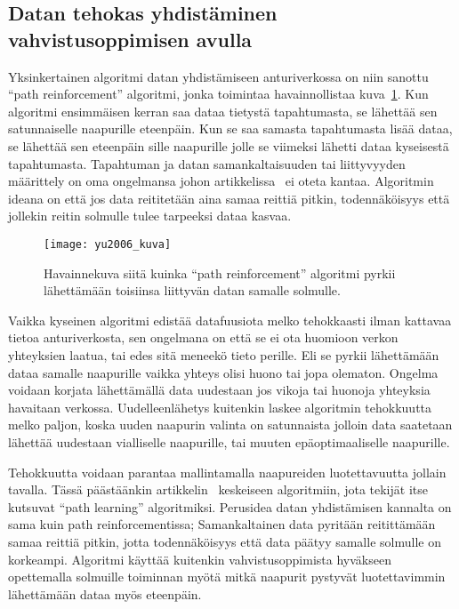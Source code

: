 \subsection{Datan tehokas yhdistäminen vahvistusoppimisen avulla}

Yksinkertainen algoritmi datan yhdistämiseen anturiverkossa on niin sanottu
``path reinforcement'' algoritmi, jonka toimintaa havainnollistaa
kuva~\ref{fig:yu2006}. Kun algoritmi ensimmäisen kerran saa dataa tietystä
tapahtumasta, se lähettää sen satunnaiselle naapurille eteenpäin. Kun se saa
samasta tapahtumasta lisää dataa, se lähettää sen eteenpäin sille naapurille
jolle se viimeksi lähetti dataa kyseisestä tapahtumasta.  Tapahtuman ja datan
samankaltaisuuden tai liittyvyyden määrittely on oma ongelmansa johon
artikkelissa~\cite{Yu2006} ei oteta kantaa. Algoritmin ideana on että jos data
reititetään aina samaa reittiä pitkin, todennäköisyys että jollekin reitin
solmulle tulee tarpeeksi dataa kasvaa.

\begin{figure}[h]
  \centering
  \texttt{[image: yu2006\_kuva]}
  \caption{Havainnekuva siitä kuinka ``path reinforcement'' algoritmi pyrkii
    lähettämään toisiinsa liittyvän datan samalle solmulle.~\parencite{Yu2006}}
\label{fig:yu2006}
\end{figure}

Vaikka kyseinen algoritmi edistää datafuusiota melko tehokkaasti ilman kattavaa
tietoa anturiverkosta, sen ongelmana on että se ei ota huomioon verkon
yhteyksien laatua, tai edes sitä meneekö tieto perille. Eli se pyrkii
lähettämään dataa samalle naapurille vaikka yhteys olisi huono tai jopa
olematon. Ongelma voidaan korjata lähettämällä data uudestaan jos vikoja tai
huonoja yhteyksia havaitaan verkossa. Uudelleenlähetys kuitenkin laskee
algoritmin tehokkuutta melko paljon, koska uuden naapurin valinta on
satunnaista jolloin data saatetaan lähettää uudestaan vialliselle naapurille,
tai muuten epäoptimaaliselle naapurille.

Tehokkuutta voidaan parantaa mallintamalla naapureiden luotettavuutta jollain
tavalla. Tässä päästäänkin artikkelin~\cite{Yu2006} keskeiseen algoritmiin,
jota tekijät itse kutsuvat ``path learning'' algoritmiksi. Perusidea datan
yhdistämisen kannalta on sama kuin path reinforcementissa; Samankaltainen data
pyritään reitittämään samaa reittiä pitkin, jotta todennäköisyys että data
päätyy samalle solmulle on korkeampi. Algoritmi käyttää kuitenkin
vahvistusoppimista hyväkseen opettemalla solmuille toiminnan myötä mitkä
naapurit pystyvät luotettavimmin lähettämään dataa myös eteenpäin.

